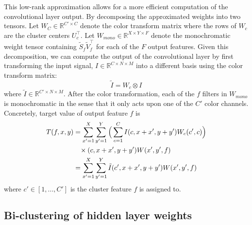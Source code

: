 This low-rank approximation allows for a more efficient computation of the convolutional layer output. By decomposing the approximated weights into two tensors. Let $W_C \in \mathbb{R}^{C' \times C}$ denote the color transform matrix where the rows of $W_c$ are the cluster centers $U_c^{\top}$. Let $W_{mono} \in \mathbb{R}^{X \times Y \times F}$ denote the monochromatic weight tensor containing $ \tilde{S}_f \tilde{V}_f^{\top}$ for each of the $F$ output features. Given this decomposition, we can compute the output of the convolutional layer by first transforming the input signal, $I \in \mathbb{R}^{C \times N \times M}$ into a different basis using the color transform matrix: 
\begin{equation*}
	\tilde{I} = W_c \otimes I
\end{equation*}
where $\tilde{I} \in \mathbb{R}^{C' \times N \times M}$. After the color transformation, each of the $f$ filters in $W_{mono}$ is monochromatic in the sense that it only acts upon one of the $C'$ color channels. Concretely, target value of output feature $f$ is
\begin{align*}
	T(f, x, y) &= \sum_{x' = 1}^{X} \sum_{y' = 1}^{Y} \Big(\sum_{c = 1}^{C} I(c, x + x', y + y') W_c(c', c) \Big) \\
			&\hspace{3mm} \times (c, x + x', y + y') W(x', y', f) \\
			&= \sum_{x' = 1}^{X} \sum_{y' = 1}^{Y} \tilde{I}(c', x + x', y + y') W(x', y', f)
\end{align*} 
where $c' \in [1, ..., C']$ is the cluster feature $f$ is assigned to. 

\subsection{Bi-clustering of hidden layer weights}






